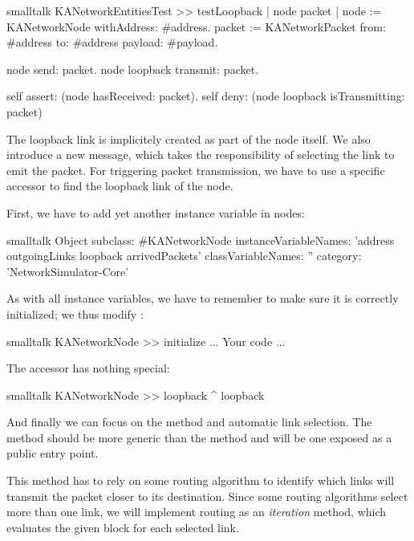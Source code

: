 \documentclass[10pt,twoside,english]{_support/latex/sbabook/sbabook}
\begin{document}
\begin{displaycode}{smalltalk}
KANetworkEntitiesTest >> testLoopback
    | node packet |
    node := KANetworkNode withAddress: #address.
    packet := KANetworkPacket from: #address to: #address payload: #payload.

    node send: packet.
    node loopback transmit: packet.

    self assert: (node hasReceived: packet).
    self deny: (node loopback isTransmitting: packet)
\end{displaycode}

The loopback link is implicitely created as part of the node itself.
We also introduce a new  message, which takes the responsibility of selecting the link to emit the packet.
For triggering packet transmission, we have to use a specific accessor to find the loopback link of the node.

First, we have to add yet another instance variable in nodes:

\begin{displaycode}{smalltalk}
Object subclass: #KANetworkNode
    instanceVariableNames: 'address outgoingLinks loopback arrivedPackets'
    classVariableNames: ''
    category: 'NetworkSimulator-Core'
\end{displaycode}

As with all instance variables, we have to remember to make sure it is correctly initialized; we thus modify :

\begin{displaycode}{smalltalk}
KANetworkNode >> initialize
    ... Your code ...
\end{displaycode}

The accessor has nothing special:

\begin{displaycode}{smalltalk}
KANetworkNode >> loopback
    ^ loopback
\end{displaycode}

And finally we can focus on the  method and automatic link selection. The method  should be more generic than the method  and will be one exposed as a public entry point.

This method has to rely on some routing algorithm to identify which links will transmit the packet closer to its destination.
Since some routing algorithms select more than one link, we will implement routing as an \textit{iteration} method, which evaluates the given block for each selected link.
\end{document}
